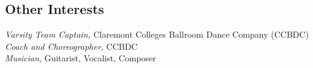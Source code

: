 \documentclass[margin, 10pt]{res} %
\begin{document}
\begin{resume}
\section{Other Interests} 

\textit{Varsity Team Captain,} Claremont Colleges Ballroom Dance Company (CCBDC)  \\
\textit{Coach and Choreographer,} CCBDC\\
\textit{Musician}, Guitarist, Vocalist, Composer


\end{resume}
\end{document}
